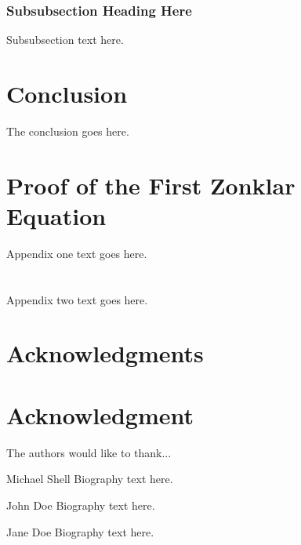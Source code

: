 \documentclass[10pt,journal,compsoc]{IEEEtran}
\begin{document}
\subsubsection{Subsubsection Heading Here}
Subsubsection text here.

\section{Conclusion}
The conclusion goes here.

\appendices
\section{Proof of the First Zonklar Equation}
Appendix one text goes here.

\section{}
Appendix two text goes here.

\ifCLASSOPTIONcompsoc
  \section*{Acknowledgments}
\else
  \section*{Acknowledgment}
\fi

The authors would like to thank...
\ifCLASSOPTIONcaptionsoff
  \newpage
\fi


\begin{IEEEbiography}{Michael Shell}
Biography text here.
\end{IEEEbiography}

\begin{IEEEbiographynophoto}{John Doe}
Biography text here.
\end{IEEEbiographynophoto}

\begin{IEEEbiographynophoto}{Jane Doe}
Biography text here.
\end{IEEEbiographynophoto}
\end{document}
